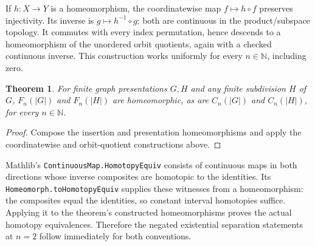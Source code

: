 \documentclass[11pt]{article}
\newtheorem{theorem}{Theorem}
\begin{document}
If $h:X\longrightarrow Y$ is a homeomorphism, the coordinatewise map
$f\mapsto h\circ f$ preserves injectivity. Its inverse is
$g\mapsto h^{-1}\circ g$; both are continuous in the product/subspace topology.
It commutes with every index permutation, hence descends to a homeomorphism of
the unordered orbit quotients, again with a checked continuous inverse. This
construction works uniformly for every $n\in\mathbb N$, including zero.

\begin{theorem}
For finite graph presentations $G,H$ and any finite subdivision $H$ of $G$,
$F_n(|G|)$ and $F_n(|H|)$ are homeomorphic, as are $C_n(|G|)$ and $C_n(|H|)$,
for every $n\in\mathbb N$.
\end{theorem}
\begin{proof}
Compose the insertion and presentation homeomorphisms and apply the coordinatewise
and orbit-quotient constructions above.
\end{proof}

Mathlib's \texttt{ContinuousMap.HomotopyEquiv} consists of continuous maps in
both directions whose inverse composites are homotopic to the identities. Its
\texttt{Homeomorph.toHomotopyEquiv} supplies these witnesses from a homeomorphism:
the composites equal the identities, so constant interval homotopies suffice.
Applying it to the theorem's constructed homeomorphisms proves the actual
homotopy equivalences. Therefore the negated existential separation statements
at $n=2$ follow immediately for both conventions.
\end{document}

